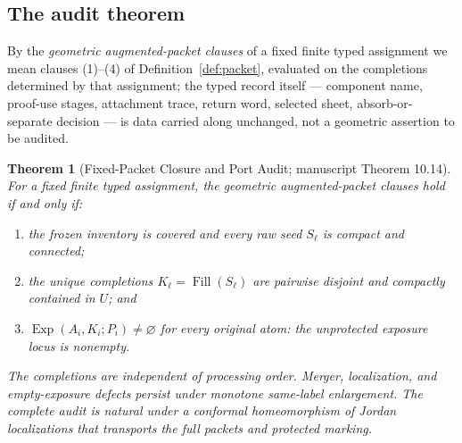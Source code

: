 \documentclass[11pt,reqno]{amsart}
\newtheorem{theorem}{Theorem}[section]
\theoremstyle{definition}
\theoremstyle{remark}
\newcommand{\Fill}{\operatorname{Fill}}
\newcommand{\Exp}{\operatorname{Exp}}
\begin{document}
\subsection{The audit theorem}\label{subsec:E-audit-thm}

By the \emph{geometric augmented-packet clauses} of a fixed finite typed assignment
we mean clauses (1)--(4) of Definition~\ref{def:packet}, evaluated on the completions
determined by that assignment; the typed record itself --- component name, proof-use
stages, attachment trace, return word, selected sheet, absorb-or-separate decision
--- is data carried along unchanged, not a geometric assertion to be audited.

\begin{theorem}[Fixed-Packet Closure and Port Audit; manuscript Theorem
10.14]\label{thm:audit}
For a fixed finite typed assignment, the geometric augmented-packet clauses hold if
and only if:
\begin{enumerate}
\item the frozen inventory is covered and every raw seed $S_\ell$ is compact and
connected;
\item the unique completions $K_\ell=\Fill(S_\ell)$ are pairwise disjoint and
compactly contained in $U$; and
\item $\Exp(A_i,K_i;P_i)\neq\varnothing$ for every original atom: the
unprotected exposure locus is nonempty.
\end{enumerate}
The completions are independent of processing order. Merger, localization, and
empty-exposure defects persist under monotone same-label enlargement. The complete
audit is natural under a conformal homeomorphism of Jordan localizations that
transports the full packets and protected marking.
\end{theorem}
\end{document}
